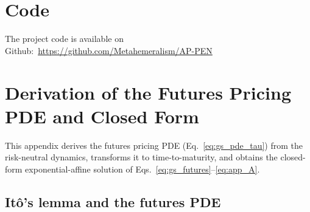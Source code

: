 \documentclass[11pt, a4paper]{article}
\begin{document}
\clearpage
\appendix

\section{Code}
The project code is available on Github:~\url{https://github.com/Metahemeralism/AP-PEN}





\section{Derivation of the Futures Pricing PDE and Closed Form}
\label{app:gs_pde}

This appendix derives the futures pricing PDE (Eq.~\ref{eq:gs_pde_tau}) from the risk-neutral dynamics, transforms it to time-to-maturity, and obtains the closed-form exponential-affine solution of Eqs.~\ref{eq:gs_futures}--\ref{eq:app_A}.

\subsection{It\^{o}'s lemma and the futures PDE}
\end{document}
